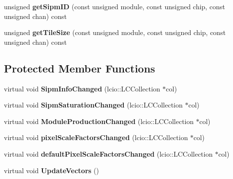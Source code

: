 \begin{DoxyCompactItemize}
\item 
unsigned {\bfseries getSipmID} (const unsigned module, const unsigned chip, const unsigned chan) const \label{classCALICE_1_1SiPmPropertiesProcessor_a97b7fa11542d26267b5cd2cc5c0e6a1f}

\item 
unsigned {\bfseries getTileSize} (const unsigned module, const unsigned chip, const unsigned chan) const \label{classCALICE_1_1SiPmPropertiesProcessor_a6b1b49d43a6efbf729f512b863b209fc}

\end{DoxyCompactItemize}
\subsection*{Protected Member Functions}
\begin{DoxyCompactItemize}
\item 
virtual void {\bfseries SipmInfoChanged} (lcio::LCCollection $\ast$col)\label{classCALICE_1_1SiPmPropertiesProcessor_a04285d3e49408159a442ee2d18a055b8}

\item 
virtual void {\bfseries SipmSaturationChanged} (lcio::LCCollection $\ast$col)\label{classCALICE_1_1SiPmPropertiesProcessor_a1f624cf4c071d6b43ec3947bec494d6e}

\item 
virtual void {\bfseries ModuleProductionChanged} (lcio::LCCollection $\ast$col)\label{classCALICE_1_1SiPmPropertiesProcessor_ac5eaa7848cada4dc39deb90cb222146d}

\item 
virtual void {\bfseries pixelScaleFactorsChanged} (lcio::LCCollection $\ast$col)\label{classCALICE_1_1SiPmPropertiesProcessor_a932baad6aff178854e72621ccfa03110}

\item 
virtual void {\bfseries defaultPixelScaleFactorsChanged} (lcio::LCCollection $\ast$col)\label{classCALICE_1_1SiPmPropertiesProcessor_a51b045d2ee4749ce79000a6204653263}

\item 
virtual void {\bfseries UpdateVectors} ()\label{classCALICE_1_1SiPmPropertiesProcessor_aba0a07bc0dbb840965bf3a18f6b0defa}

\end{DoxyCompactItemize}
